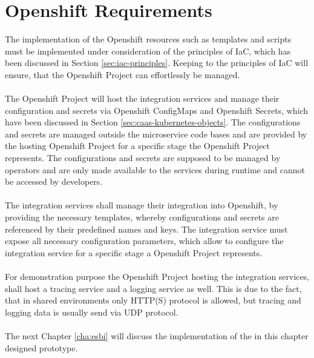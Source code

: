 \section{Openshift Requirements}
\label{sec:esboc-requirements-oc}
The implementation of the Openshift resources such as templates and scripts must be implemented under consideration of the principles of IaC, which has been discussed in Section \vref{sec:iac-principles}. Keeping to the principles of IaC will ensure, that the Openshift Project can effortlessly be managed.   
\\ \\
The Openshift Project will host the integration services and manage their configuration and secrets via Openshift ConfigMaps and Openshift Secrets, which have been discussed in Section \vref{sec:caas-kubernetes-objects}. The configurations and secrets are managed outside the microservice code bases and are provided by the hosting Openshift Project for a specific stage the Openshift Project represents. The configurations and secrets are supposed to be managed by operators and are only made available to the services during runtime and cannot be accessed by developers.
\\ \\
The integration services shall manage their integration into Openshift, by providing the necessary templates, whereby configurations and secrets are referenced by their predefined names and keys. The integration service must expose all necessary configuration parameters, which allow to configure the integration service for a specific stage a Openshift Project represents.
\\ \\
For demonstration purpose the Openshift Project hosting the integration services, shall host a tracing service and a logging service as well. This is due to the fact, that in shared environments only HTTP(S) protocol is allowed, but tracing and logging data is usually send via UDP protocol. 
\\ \\
The next Chapter \vref{cha:esbi} will discuss the implementation of the in this chapter designed prototype. 
